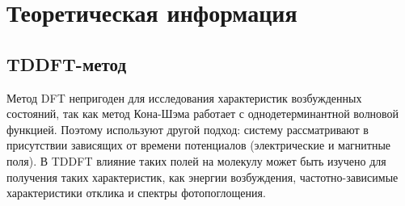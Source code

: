 \section{Теоретическая информация}
\subsection{TDDFT-метод}
Метод DFT непригоден для исследования характеристик возбужденных состояний, так как метод Кона-Шэма работает с однодетерминантной волновой функцией. Поэтому используют другой подход: систему рассматривают в присутствии зависящих от времени потенциалов (электрические и магнитные поля). В TDDFT влияние таких полей на молекулу может быть изучено для получения таких характеристик, как энергии возбуждения, частотно-зависимые характеристики отклика и спектры фотопоглощения. 